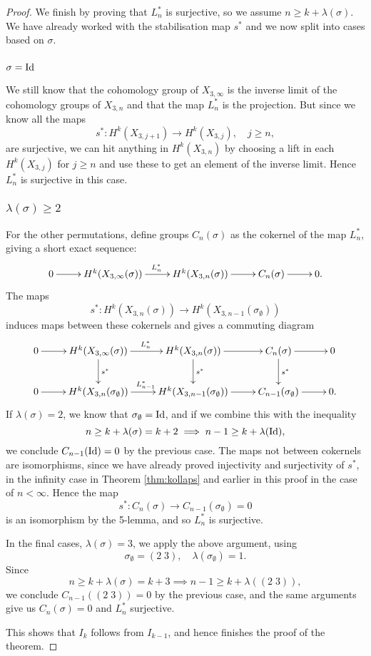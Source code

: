 \begin{proof}
  We finish by proving that $L_n^*$ is surjective, so we assume $n \geq
  k+\lambda(\sigma)$. We have already
  worked with the stabilisation map $s^*$ and we now split into cases
  based on $\sigma$.
  
  \subsubsection{$\sigma = \operatorname{Id}$}
  
  We still know that the cohomology group of $X_{3,\infty}$ is the
  inverse limit of the
  cohomology groups of $X_{3,n}$ and that the map $L_n^*$ is the
  projection. But since we know all the maps 
  \[s^* : H^k(X_{3,j+1})\to H^k(X_{3,j}), \quad j \geq n, \]
  are surjective, we can hit anything in $H^k(X_{3,n})$ by choosing a
  lift in each $H^k(X_{3,j})$ for $j \geq n$ and use these to get an
  element of the inverse limit. Hence $L_n^*$ is surjective in this
  case.
  
  \subsubsection{$\lambda(\sigma) \geq 2$}
  
  For the other permutations, define groups $C_n(\sigma)$ as the
  cokernel of the map $L_n^*$, giving a short exact sequence:
  \[ \xymatrix{ 0 \ar[r] & H^k(X_{3,\infty}(\sigma))
    \ar[r]^{L_{n}^*} &
    H^k(X_{3,n}(\sigma)) \ar[r] &
    C_{n}(\sigma) \ar[r] &  0.} \]
  The maps
  \[s^* : H^k(X_{3,n}(\sigma)) \to H^k(X_{3,n-1}(\sigma_{\emptyset})) \]
  induces maps between these cokernels and gives a commuting diagram
  \[ \xymatrix{ 0 \ar[r] & H^k(X_{3,\infty}(\sigma))
    \ar[r]^{L_{n}^*}\ar[d]^-{s^*} &
    H^k(X_{3,n}(\sigma)) \ar[r]\ar[d]^-{s^*} &
    C_{n}(\sigma) \ar[r]\ar[d]^-{s^*} &  0 \\
    0 \ar[r] & H^k(X_{3,n}(\sigma_{\emptyset})) \ar[r]^{L_{n-1}^*} &
    H^k(X_{3,n-1}(\sigma_{\emptyset})) \ar[r] &
    C_{n-1}(\sigma_{\emptyset}) \ar[r] &  0. } \]
  If $\lambda(\sigma) = 2$, we know that $\sigma_{\emptyset} = \operatorname{Id}$, and
  if we combine this with the inequality
  \[ n \geq k+\lambda(\sigma) = k+2 \implies n-1 \geq
  k+\lambda(\operatorname{Id}), \]
  we conclude $C_{n-1}(\operatorname{Id}) = 0$ by the previous case. The
  maps not between cokernels are isomorphisms, since we have already
  proved
  injectivity and surjectivity of $s^*$, in the infinity case in
  Theorem \ref{thm:kollaps} and earlier in this proof in the case of $n
  < \infty$. Hence the map 
  \[ s^* : C_{n}(\sigma) \to C_{n-1}(\sigma_{\emptyset}) = 0 \]
  is an isomorphism by the 5-lemma, and so $L_n^*$ is surjective.
  
  In the final cases, $\lambda(\sigma) = 3$, we apply the above
  argument, using
  \[ \sigma_{\emptyset} = (2\; 3),\quad \lambda(\sigma_{\emptyset}) =
  1. \]
  Since
  \[ n \geq k+\lambda(\sigma) = k + 3 \implies n-1 \geq  k +
  \lambda((2\;3)), \]
  we conclude $C_{n-1}((2\;3))=0$ by the previous case, and the same
  arguments give us $C_{n}(\sigma) = 0$ and $L^*_n$ surjective.
  
  This shows that $I_k$ follows from $I_{k-1}$, and hence finishes the
  proof of the theorem.
\end{proof}


